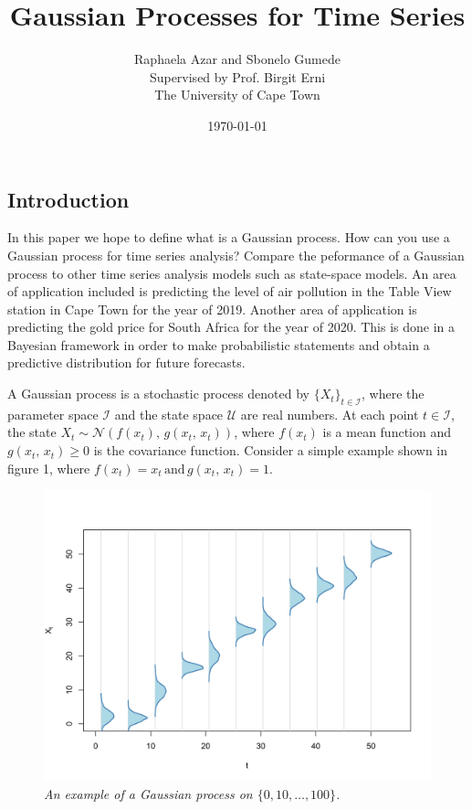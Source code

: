 \documentclass[a4paper, 10pt]{article}
\title{Gaussian Processes for Time Series}
\date{\today}
\author{Raphaela Azar and Sbonelo Gumede \\
Supervised by Prof. Birgit Erni\\
The University of Cape Town}
\begin{document}
   \maketitle

   \begin{flushleft}

   \section*{Introduction}

   In this paper we hope to define what is a Gaussian process. How can you use a Gaussian process for time series analysis? Compare the peformance of a Gaussian process to other time series analysis models such as state-space models. An area of application included is predicting the level of air pollution in the Table View station in Cape Town for the year of 2019. Another area of application is predicting the gold price for South Africa for the year of 2020. This is done in a Bayesian framework in order to make probabilistic statements and obtain a predictive distribution for future forecasts.

   \vspace{1em}

   A Gaussian process is a stochastic process denoted by $\{X_{t} \}_{t \in \mathcal{I}}$, where the parameter space $\mathcal{I}$ and the state space $\mathcal{U}$ are real numbers. 
   At each point $t \in \mathcal{I}$, the state $X_{t} \sim \mathcal{N}(f(x_{t}), \, g(x_{t}, \, x_{t}))$, where $f(x_{t})$ is a mean function and $g(x_{t}, \, x_{t}) \geq 0$ is the covariance function.  
   Consider a simple example shown in figure 1, where $f(x_{t}) = x_{t} \, \text{and} \, g(x_{t}, \, x_{t}) = 1$.
   
   \begin{figure}[H]
      \centering
      \includegraphics[width=0.48\linewidth]{../img/gp.png}
      \caption{\textit{An example of a Gaussian process on $\{0, 10, \ldots, 100\}$.}}
   \end{figure}
   

\end{flushleft}
\end{document}
